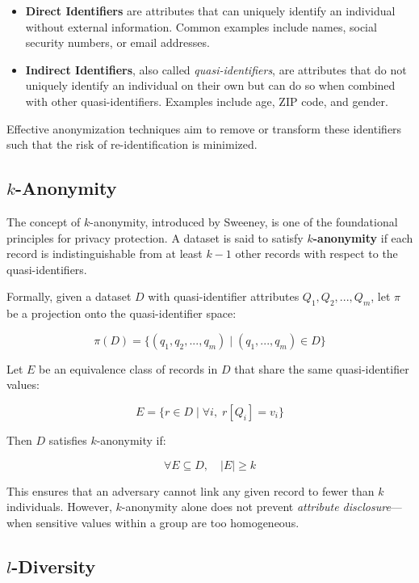 \documentclass{article}
\begin{document}
\begin{itemize}
\item \textbf{Direct Identifiers} are attributes that can uniquely identify an individual without external information. Common examples include names, social security numbers, or email addresses.

\item \textbf{Indirect Identifiers}, also called \textit{quasi-identifiers}, are attributes that do not uniquely identify an individual on their own but can do so when combined with other quasi-identifiers. Examples include age, ZIP code, and gender.
\end{itemize}

Effective anonymization techniques aim to remove or transform these identifiers such that the risk of re-identification is minimized.

\subsection{$k$-Anonymity}

The concept of $k$-anonymity, introduced by Sweeney, is one of the foundational principles for privacy protection. A dataset is said to satisfy \textbf{$k$-anonymity} if each record is indistinguishable from at least $k-1$ other records with respect to the quasi-identifiers.

Formally, given a dataset $D$ with quasi-identifier attributes $Q_1, Q_2, ..., Q_m$, let $\pi$ be a projection onto the quasi-identifier space:

$$
\pi(D) = \{ (q_1, q_2, ..., q_m) \mid (q_1, ..., q_m) \in D \}
$$

Let $E$ be an equivalence class of records in $D$ that share the same quasi-identifier values:

$$
E = \{ r \in D \mid \forall i, \; r[Q_i] = v_i \}
$$

Then $D$ satisfies $k$-anonymity if:

$$
\forall E \subseteq D, \quad |E| \geq k
$$

This ensures that an adversary cannot link any given record to fewer than $k$ individuals. However, $k$-anonymity alone does not prevent \textit{attribute disclosure}—when sensitive values within a group are too homogeneous.

\subsection{$l$-Diversity}
\end{document}
